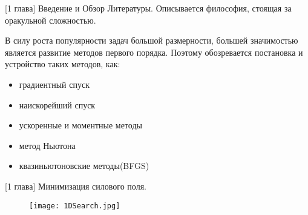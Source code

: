 
\begin{frame}{[1 глава] Введение и Обзор Литературы.}
    Описывается философия, стоящая за оракульной сложностью. 
    
    В силу роста популярности задач большой размерности, большей значимостью является развитие методов первого порядка.
    Поэтому обозревается постановка и устройство таких методов, как:
    \begin{itemize}
        \item градиентный спуск
        \item наискорейший спуск
        \item ускоренные и моментные методы
        \item метод Ньютона
        \item квазиньютоновские методы(BFGS)
    \end{itemize}
\end{frame}


\begin{frame}{[1 глава] Минимизация силового поля.}
    \begin{figure}
    \begin{center}
        \texttt{[image: 1DSearch.jpg]}
    \end{center}
    \end{figure}
    \begin{table}[h]
    \centering
    \end{table}
\end{frame}


